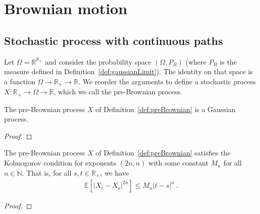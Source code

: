 \chapter{Brownian motion}
\label{chap:brownian}


\section{Stochastic process with continuous paths}

\begin{definition}\label{def:preBrownian}
  \leanok
Let $\Omega = \mathbb{R}^{\mathbb{R}_+}$ and consider the probability space $(\Omega, P_B)$ (where $P_B$ is the measure defined in Definition~\ref{def:gaussianLimit}).
The identity on that space is a function $\Omega \to \mathbb{R}_+ \to \mathbb{R}$.
We reorder the arguments to define a stochastic process $X : \mathbb{R}_+ \to \Omega \to \mathbb{R}$, which we call the pre-Brownian process.
\end{definition}


\begin{lemma}\label{lem:isGaussianProcess_preBrownian}
  \leanok
  The pre-Brownian process $X$ of Definition~\ref{def:preBrownian} is a Gaussian process.
\end{lemma}

\begin{proof}

\end{proof}


\begin{lemma}\label{lem:isKolmogorovProcess_preBrownian}
  The pre-Brownian process $X$ of Definition~\ref{def:preBrownian} satisfies the Kolmogorov condition for exponents $(2n,n)$ with some constant $M_n$ for all $n \in \mathbb{N}$.
  That is, for all $s, t \in \mathbb{R}_+$, we have
  \begin{align*}
    \mathbb{E} \left[ |X_t - X_s|^{2n} \right] \le M_n |t - s|^n
    \: .
  \end{align*}
\end{lemma}

\begin{proof}

\end{proof}


